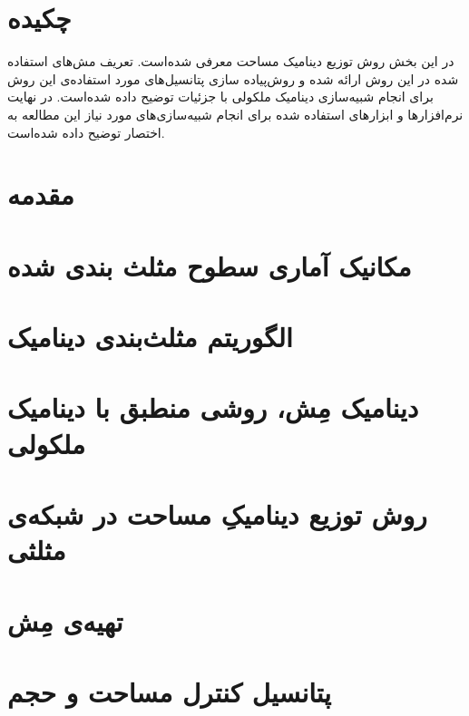 \setRL
\clearpage
\def \MemMethod {\Mempath /MembraneMethod}

\section{
چکیده
}
در این بخش روش توزیع دینامیک مساحت معرفی شده‌است. تعریف مش‌های استفاده شده در این روش ارائه شده و روش‌پیاده سازی پتانسیل‌های مورد استفاده‌ی این روش برای انجام شبیه‌سازی دینامیک ملکولی با جزئیات توضیح داده شده‌است. در نهایت نرم‌افزار‌ها و ابزارهای استفاده شده برای انجام شبیه‌سازی‌های مورد نیاز این مطالعه به اختصار توضیح داده شده‌است.

\section{
مقدمه
}



\section{\label{sec:statMech}
مکانیک آماری سطوح مثلث بندی شده
}


\section{
الگوریتم مثلث‌بندی دینامیک
}


\section{
دینامیک مِش، روشی منطبق با دینامیک ملکولی
}




\section{
روش توزیع دینامیکِ مساحت در شبکه‌ی مثلثی
}


\section{
تهیه‌ی مِش
}


\section{
پتانسیل کنترل مساحت و حجم
}


